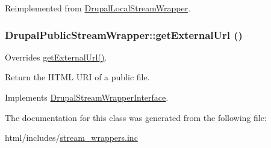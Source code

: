 Reimplemented from \hyperlink{classDrupalLocalStreamWrapper_a3ff87a4643479303f4880f2381d0f432}{DrupalLocalStreamWrapper}.\hypertarget{classDrupalPublicStreamWrapper_a226f45aed9d947aa34aa0b3c7053fdaf}{
\subsubsection[{getExternalUrl}]{\setlength{\rightskip}{0pt plus 5cm}DrupalPublicStreamWrapper::getExternalUrl ()}}
\label{classDrupalPublicStreamWrapper_a226f45aed9d947aa34aa0b3c7053fdaf}
Overrides \hyperlink{classDrupalPublicStreamWrapper_a226f45aed9d947aa34aa0b3c7053fdaf}{getExternalUrl()}.

Return the HTML URI of a public file. 

Implements \hyperlink{interfaceDrupalStreamWrapperInterface_af8474357b8c79f1a7629084a05541d16}{DrupalStreamWrapperInterface}.

The documentation for this class was generated from the following file:\begin{DoxyCompactItemize}
\item 
html/includes/\hyperlink{stream__wrappers_8inc}{stream\_\-wrappers.inc}\end{DoxyCompactItemize}
